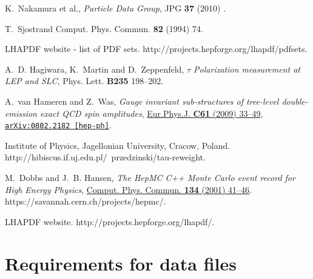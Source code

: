 \documentclass[12pt]{article}
\begin{document}
\begin{thebibliography}{10}
K.~Nakamura et al., {\em {Particle Data Group}\/},
JPG {\bf 37} (2010)  .

T.~Sjostrand
Comput. Phys. Commun. {\bf 82} (1994)  74.

{LHAPDF website - list of PDF sets}.
  {http://projects.hepforge.org/lhapdf/pdfsets}.

A.~D. Hagiwara, K.~Martin and D.~Zeppenfeld, {\em {$\tau$ Polarization
  measurement at LEP and SLC}\/},
Phys. Lett. {\bf B235}  198--202.

A.~van Hameren and Z.~Was, {\em {Gauge invariant sub-structures of tree-level
  double-emission exact QCD spin amplitudes}\/},
  \href{http://dx.doi.org/10.1140/epjc/s10052-009-0977-3}{Eur.Phys.J. {\bf C61}
  (2009)  33--49}, \href{http://arxiv.org/abs/0802.2182}{{\tt arXiv:0802.2182
  [hep-ph]}}.

{Institute of Physics, Jagellonian University, Cracow, Poland}.
  {http://hibiscus.if.uj.edu.pl/~przedzinski/tau-reweight}.

M.~Dobbs and J.~B. Hansen, {\em {The HepMC C++ Monte Carlo event record for
  High Energy Physics}\/},
  \href{http://dx.doi.org/10.1016/S0010-4655(00)00189-2}{Comput. Phys. Commun.
  {\bf 134} (2001)  41--46}.
https://savannah.cern.ch/projects/hepmc/.

{LHAPDF website}. {http://projects.hepforge.org/lhapdf/}.

\end{thebibliography}\endgroup
%
%
\newpage

\appendix
\section{Requirements for data files}
\label{App:information}
\end{document}
